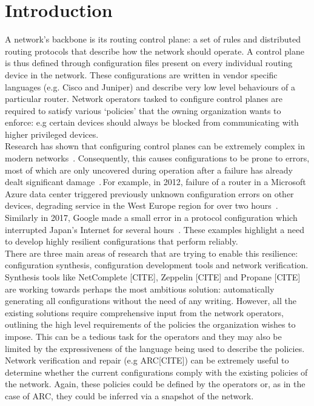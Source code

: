 \section{Introduction}

A network's backbone is its routing control plane: a set of rules and distributed routing protocols that describe how the network should operate. A control plane is thus defined through configuration files present on every individual routing device in the network. These configurations are written in vendor specific languages (e.g. Cisco and Juniper) and describe very low level behaviours of a particular router. Network operators tasked to configure control planes are required to satisfy various `policies' that the owning organization wants to enforce: e.g certain devices should always be blocked from communicating with higher privileged devices.\\

Research has shown that configuring control planes can be extremely complex in modern networks~\cite{complexity}. Consequently, this causes configurations to be prone to errors, most of which are only uncovered during operation after a failure has already dealt significant damage~\cite{errors}. For example, in 2012, failure of a router in a Microsoft Azure data center triggered previously unknown configuration errors on other devices, degrading service in the West Europe region for over two hours~\cite{azure}. Similarly in 2017, Google made a small error in a protocol configuration which interrupted Japan's Internet for several hours~\cite{googlebgp}. These examples highlight a need to develop highly resilient configurations that perform reliably.\\  

There are three main areas of research that are trying to enable this resilience: configuration synthesis, configuration development tools and network verification. Synthesis tools like NetComplete [CITE], Zeppelin [CITE] and Propane [CITE] are working towards perhaps the most ambitious solution: automatically generating all configurations without the need of any writing. However, all the existing solutions require comprehensive input from the network operators, outlining the high level requirements of the policies the organization wishes to impose. This can be a tedious task for the operators and they may also be limited by the expressiveness of the language being used to describe the policies.\\ 

Network verification and repair (e.g ARC[CITE]) can be extremely useful to determine whether the current configurations comply with the existing policies of the network. Again, these policies could be defined by the operators or, as in the case of ARC, they could be inferred via a snapshot of the network.


